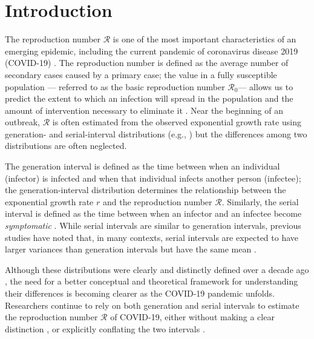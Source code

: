 \documentclass[12pt]{article}
\newcommand{\Rx}[1]{\ensuremath{{\mathcal R}_{#1}}\xspace}
\newcommand{\Ro}{\Rx{0}}
\newcommand{\RR}{\ensuremath{{\mathcal R}}\xspace}
\begin{document}
\pagebreak

\section{Introduction}

The reproduction number \RR is one of the most important characteristics of an emerging epidemic, including the current pandemic of coronavirus disease 2019 (COVID-19) \citep{majumder2020early}.
The reproduction number is defined as the average number of secondary cases caused by a primary case;
the value in a fully susceptible population --- referred to as the basic reproduction number \Ro --- allows us to predict the extent to which an infection will spread in the population and the amount of intervention necessary to eliminate it \citep{anderson1991infectious}.
Near the beginning of an outbreak, \RR is often estimated from the observed exponential growth rate using generation- and serial-interval distributions (e.g., \cite{wallinga2007generation, fraser2009pandemic, hampson2009transmission, chunara2012social, chowell2014west, du2020serial, jung2020real}) but the differences among two distributions are often neglected.

The generation interval is defined as the time between when an individual (infector) is infected and when that individual infects another person (infectee);
the generation-interval distribution determines the relationship between the exponential growth rate $r$ and the reproduction number \RR \citep{anderson1991infectious, ferguson2005strategies, wallinga2007generation}.
Similarly, the serial interval is defined as the time between when an infector and an infectee become \emph{symptomatic} \citep{svensson2007note}.
While serial intervals are similar to generation intervals, previous studies have noted that, in many contexts, serial intervals are expected to have larger variances than generation intervals but have the same mean \citep{svensson2007note,klinkenberg2011correlation,te2013estimating,champredon2018equivalence}.

Although these distributions were clearly and distinctly defined over a decade ago \citep{svensson2007note}, 
the need for a better conceptual and theoretical framework for understanding their differences is becoming clearer as the COVID-19 pandemic unfolds.
Researchers continue to rely on both generation and serial intervals to estimate the reproduction number \RR of COVID-19, either without making a clear distinction \citep{tempvar,du2020serial,he2020temporal,wu2020nowcasting,zhao2020serial}, or explicitly conflating the two intervals
\citep{anderson2020will,hellewell2020feasibility}.
\end{document}
